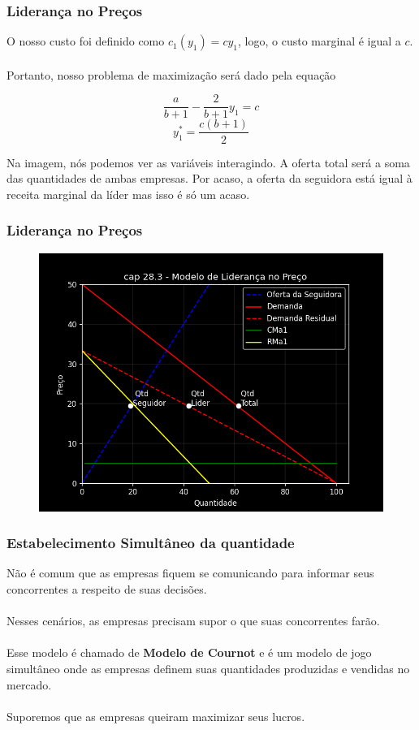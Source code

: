 \documentclass{beamer}[10]
\begin{document}
\begin{frame}
	\frametitle{Liderança no Preços}

	O nosso custo foi definido como $c_1(y_1) = cy_1$, logo, o custo marginal é igual a $c$.
	\\~\\
	Portanto, nosso problema de maximização será dado pela equação

	$$ \frac{a}{b+1} - \frac{2}{b+1}y_1 = c $$
	$$ y_1^* = \frac{c(b+1)}{2} $$

	Na imagem, nós podemos ver as variáveis interagindo. A oferta total será a soma das quantidades de ambas empresas. Por acaso, a oferta da seguidora está igual à receita marginal da líder mas isso é só um acaso.

\end{frame}

\begin{frame}
	\frametitle{Liderança no Preços}

	\begin{figure}[H]
		\centering
		\includegraphics[scale=0.55]{cap28_3-lideranca_preco.png}
	\end{figure}

\end{frame}

\begin{frame}
	\frametitle{Estabelecimento Simultâneo da quantidade}

	Não é comum que as empresas fiquem se comunicando para informar seus concorrentes a respeito de suas decisões.
	\\~\\
	Nesses cenários, as empresas precisam supor o que suas concorrentes farão.
	\\~\\
	Esse modelo é chamado de \textbf{Modelo de Cournot} e é um modelo de jogo simultâneo onde as empresas definem suas quantidades produzidas e vendidas no mercado.
	\\~\\
	Suporemos que as empresas queiram maximizar seus lucros.

\end{frame}
\end{document}

